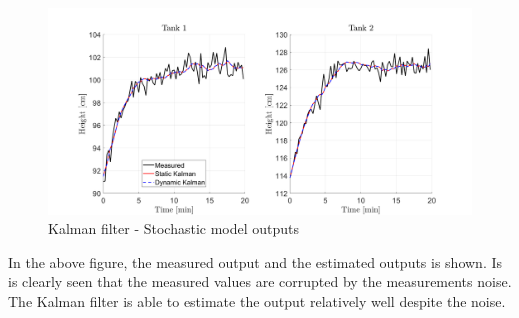 \begin{figure}[H]
    \centering
    \includegraphics[width=1\textwidth]{Figures/Pr5.2_stoc_output.png}
    \caption{Kalman filter - Stochastic model outputs}
    \label{fig:Kalman_stoc_output}
\end{figure}
In the above figure, the measured output and the estimated outputs is shown. Is is clearly seen that the measured values are corrupted by the measurements noise. The Kalman filter is able to estimate the output relatively well despite the noise.